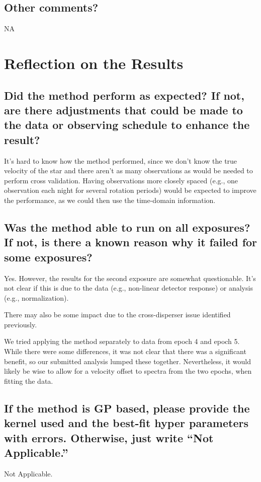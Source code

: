 \documentclass[12pt]{article}
\begin{document}
\subsection{Other comments?}

NA

\section{Reflection on the Results}
\subsection{Did the method perform as expected?  If not, are there adjustments that could be made to the data or observing schedule to enhance the result?}

It's hard to know how the method performed, since we don't know the true velocity of the star and there aren't as many observations as would be needed to perform cross validation.
Having observations more closely spaced (e.g., one observation each night for several rotation periods) would be expected to improve the performance, as we could then use the time-domain information.

\subsection{Was the method able to run on all exposures?  If not, is there a known reason why it failed for some exposures?}

Yes.
However, the results for the second exposure are somewhat questionable.
It's not clear if this is due to the data (e.g., non-linear detector response) or analysis (e.g., normalization).

There may also be some impact due to the cross-disperser issue identified previously.

We tried applying the method separately to data from epoch 4 and epoch 5.
While there were some differences, it was not clear that there was a significant benefit, so our submitted analysis lumped these together.
Nevertheless, it would likely be wise to allow for a velocity offset to spectra from the two epochs, when fitting the data.

\subsection{If the method is GP based, please provide the kernel used and the best-fit hyper parameters with errors.  Otherwise, just write ``Not Applicable.''}
Not Applicable.
\end{document}
